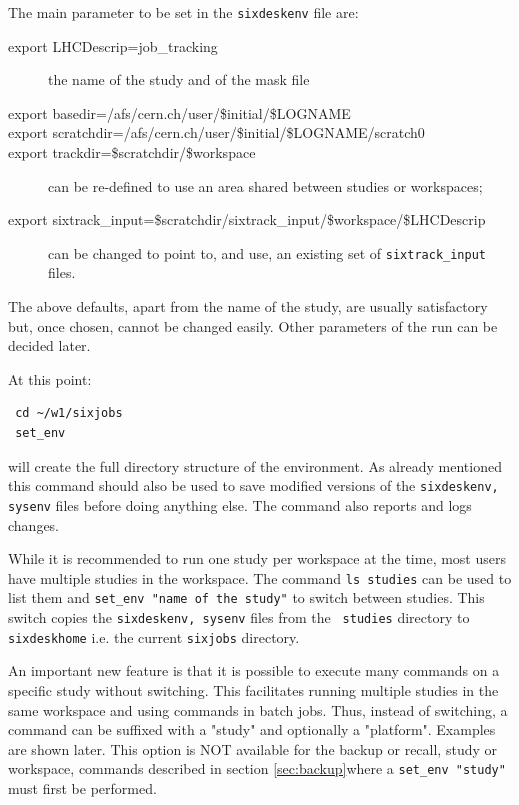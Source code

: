 \documentclass{cernatsnote}
\begin{document}
The main parameter to be set in the \texttt{sixdeskenv} file are:
\begin{description}
\item [export LHCDescrip=job\_tracking] the name of the study and of the mask file
\item [export basedir=/afs/cern.ch/user/\$initial/\$LOGNAME]
\item [export scratchdir=/afs/cern.ch/user/\$initial/\$LOGNAME/scratch0]
\item [export trackdir=\$scratchdir/\$workspace]
can be re-defined to use an area shared between studies or workspaces;
\item [export sixtrack\_input=\$scratchdir/sixtrack\_input/\$workspace/\$LHCDescrip]
can be changed to point to, and use, an existing set of \texttt{sixtrack\_input} files.
\end{description}

The above defaults, apart from the name of the study, are usually satisfactory
but, once chosen, cannot be changed easily. Other parameters of the run can be
decided later.

At this point:
\begin{verbatim}
 cd ~/w1/sixjobs
 set_env
\end{verbatim}
will create the full directory structure of the environment.  As already
mentioned this command should also be used to save modified versions of the
\texttt{sixdeskenv, sysenv} files before doing anything else. The command also
reports and logs changes.

While it is recommended to run one study per workspace at the time, most users
have multiple studies in the workspace. The command \texttt{ls studies} can be
used to list them and \texttt{set\_env "name of the study"} to switch between
studies.  This switch copies the \texttt{sixdeskenv, sysenv} files from the {\tt
studies} directory to \texttt{sixdeskhome} i.e. the current \texttt{sixjobs}
directory.

An important new feature is that it is possible to execute many commands on a
specific study without switching. This facilitates running multiple studies in
the same workspace and using commands in batch jobs.  Thus, instead of
switching, a command can be suffixed with a "study" and optionally a
"platform". Examples are shown later.  This option is NOT available for the
backup or recall, study or workspace, commands described in section
\ref{sec:backup}where a \texttt{set\_env "study"} must first be performed.
\end{document}
